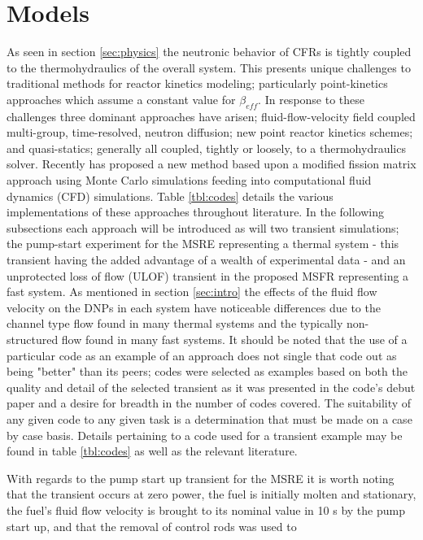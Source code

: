 \documentclass[review]{elsarticle}
\begin{document}
\section{Models} \label{sec:models}
As seen in section \ref{sec:physics} the neutronic behavior of CFRs is tightly
coupled to the thermohydraulics of the overall system. This presents unique
challenges to traditional methods for reactor kinetics modeling; particularly
point-kinetics approaches which assume a constant value for $\beta_{eff}$. In
response to these challenges three dominant approaches have arisen; 
fluid-flow-velocity field coupled multi-group, time-resolved, neutron diffusion;
new point reactor kinetics schemes; and quasi-statics; generally all coupled, tightly
or loosely, to a thermohydraulics solver. Recently
\cite{laureau_coupled_2015} has proposed a new method based upon a modified
fission matrix approach using Monte Carlo simulations feeding into
computational fluid dynamics (CFD) simulations. Table \ref{tbl:codes} details
the various implementations of these approaches throughout literature.
In the following subsections
each approach will be introduced as will two transient simulations; the pump-start
experiment for the MSRE representing a thermal system - this transient having
the added advantage of a wealth of experimental data - and an unprotected loss
of flow (ULOF) transient in the proposed MSFR representing a fast system.
As mentioned in
section \ref{sec:intro} the effects of the fluid flow velocity on the DNPs in each
system have noticeable differences due to the channel type flow found in many
thermal systems and the typically non-structured flow found in many fast
systems.
It should be noted that the use of a particular code as an example of an
approach does not single that code out as being "better" than its peers; codes
were selected as examples based on both the quality and detail of the selected
transient as it was presented in the code's debut paper and a desire for breadth in the number of codes covered. The suitability of any given code to any given task
is a determination that must be made on a case by case basis. Details pertaining
to a code used for a transient example may be found in table \ref{tbl:codes} as
well as the relevant literature.
\par With regards to the pump start up transient for the MSRE it is worth noting
that the transient occurs at zero power, the fuel is initially molten and
stationary, the fuel's fluid flow velocity is brought to its nominal value in
10 s by the pump start up, and that the removal of control rods was used to
\end{document}
